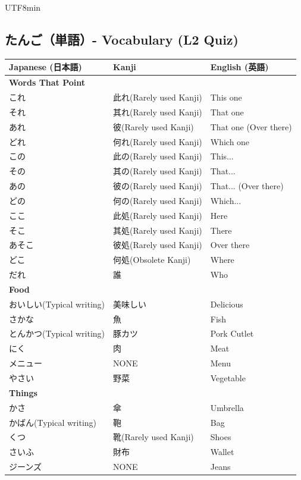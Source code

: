 \documentclass[11pt]{article}
\begin{document}
\begin{CJK}{UTF8}{min}
\subsection{たんご（単語）- Vocabulary (L2 Quiz)}
\begin{tabularx}{\linewidth}{X | X | X}
    \toprule
    \textbf{Japanese (日本語)} & \textbf{Kanji} & \textbf{English (英語)} \\
    \midrule
    \textbf{Words That Point} &  & \\
    これ & 此れ(Rarely used Kanji) & This one \\
    それ & 其れ(Rarely used Kanji) & That one \\
    あれ & 彼(Rarely used Kanji) & That one (Over there) \\
    どれ & 何れ(Rarely used Kanji) & Which one \\
    この & 此の(Rarely used Kanji) & This... \\
    その & 其の(Rarely used Kanji) & That... \\
    あの & 彼の(Rarely used Kanji) & That... (Over there) \\
    どの & 何の(Rarely used Kanji) & Which... \\
    ここ & 此処(Rarely used Kanji) & Here \\
    そこ & 其処(Rarely used Kanji) & There \\
    あそこ & 彼処(Rarely used Kanji) & Over there \\
    どこ & 何処(Obsolete Kanji) & Where \\
    だれ & 誰 & Who \\
    \hline
    \textbf{Food} &  & \\
    おいしい(Typical writing) & 美味しい & Delicious \\
    さかな & 魚 & Fish \\
    とんかつ(Typical writing) & 豚カツ & Pork Cutlet \\
    にく & 肉 & Meat \\
    メニュー & NONE & Menu \\
    やさい & 野菜 & Vegetable \\
    \hline
    \textbf{Things} &  & \\
    かさ & 傘 & Umbrella \\
    かばん(Typical writing) & 鞄 & Bag \\
    くつ & 靴(Rarely used Kanji) & Shoes \\
    さいふ & 財布 & Wallet \\
    ジーンズ & NONE & Jeans \\

\end{tabularx}
\end{CJK}
\end{document}

